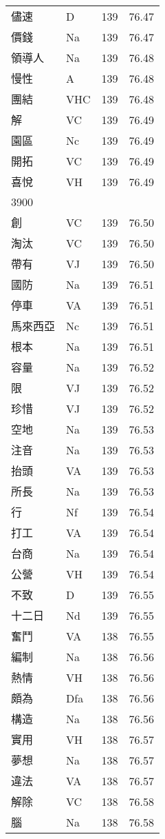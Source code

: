 \documentclass[twocolumn]{book}
\begin{document}
\begin{supertabular}{llrr}
儘速 & D & 139 &  76.47\\
價錢 & Na & 139 &  76.47\\
領導人 & Na & 139 &  76.48\\
慢性 & A & 139 &  76.48\\
團結 & VHC & 139 &  76.48\\
解 & VC & 139 &  76.49\\
園區 & Nc & 139 &  76.49\\
開拓 & VC & 139 &  76.49\\
喜悅 & VH & 139 &  76.49\\
3900\\
創 & VC & 139 &  76.50\\
淘汰 & VC & 139 &  76.50\\
帶有 & VJ & 139 &  76.50\\
國防 & Na & 139 &  76.51\\
停車 & VA & 139 &  76.51\\
馬來西亞 & Nc & 139 &  76.51\\
根本 & Na & 139 &  76.51\\
容量 & Na & 139 &  76.52\\
限 & VJ & 139 &  76.52\\
珍惜 & VJ & 139 &  76.52\\
空地 & Na & 139 &  76.53\\
注音 & Na & 139 &  76.53\\
抬頭 & VA & 139 &  76.53\\
所長 & Na & 139 &  76.53\\
行 & Nf & 139 &  76.54\\
打工 & VA & 139 &  76.54\\
台商 & Na & 139 &  76.54\\
公營 & VH & 139 &  76.54\\
不致 & D & 139 &  76.55\\
十二日 & Nd & 139 &  76.55\\
奮鬥 & VA & 138 &  76.55\\
編制 & Na & 138 &  76.56\\
熱情 & VH & 138 &  76.56\\
頗為 & Dfa & 138 &  76.56\\
構造 & Na & 138 &  76.56\\
實用 & VH & 138 &  76.57\\
夢想 & Na & 138 &  76.57\\
違法 & VA & 138 &  76.57\\
解除 & VC & 138 &  76.58\\
腦 & Na & 138 &  76.58\\

\end{supertabular}
\end{document}
